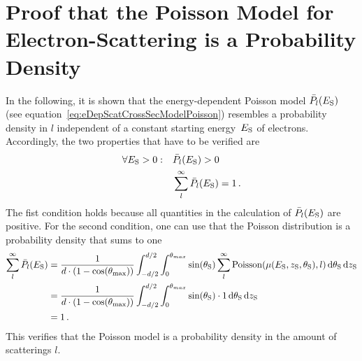 \section{Proof that the Poisson Model for Electron-Scattering is a Probability Density}
\label{sec:appendixEDepScatCrossSecPoissonModelProbDensityProof}
In the following, it is shown that the energy-dependent Poisson model $\bar{P}_l(E_\mathrm{S})$ (see equation~\ref{eq:eDepScatCrossSecModelPoisson}) resembles a probability density in $l$ independent of a constant starting energy~$E_\mathrm{S}$ of electrons. Accordingly, the two properties that have to be verified are
\begin{align}
\forall E_\mathrm{S} > 0: \quad
&\bar{P}_l(E_\mathrm{S}) > 0 \\
&\sum_{l}^{\infty} \bar{P}_l(E_\mathrm{S}) = 1
\text{\,.}
\end{align}
The fist condition holds because all quantities in the calculation of $\bar{P}_l(E_\mathrm{S})$ are positive. For the second condition, one can use that the Poisson distribution is a probability density that sums to one
\begin{align*}
\sum_{l}^{\infty} \bar{P}_l(E_\mathrm{S}) &=
\frac{1}{d \cdot (1-\cos(\theta_\mathrm{max}))} 
\int_{-d/2}^{d/2}  
\int_{0}^{\theta_{max}} 
\sin(\theta_\mathrm{S})
\sum_{l}^{\infty}
\mathrm{Poisson}(\mu(E_\mathrm{S},z_\mathrm{S},\theta_\mathrm{S}),l)
\mathop{}\!\mathrm{d}\theta_\mathrm{S}
\mathop{}\!\mathrm{d}z_\mathrm{S} \\  &=
\frac{1}{d \cdot (1-\cos(\theta_\mathrm{max}))} 
\int_{-d/2}^{d/2}  
\int_{0}^{\theta_{max}} 
\sin(\theta_\mathrm{S})
\cdot 1
\mathop{}\!\mathrm{d}\theta_\mathrm{S}
\mathop{}\!\mathrm{d}z_\mathrm{S} \\ &= 1
\text{\,.}
\end{align*}
This verifies that the Poisson model is a probability density in the amount of scatterings $l$.
\clearpage

